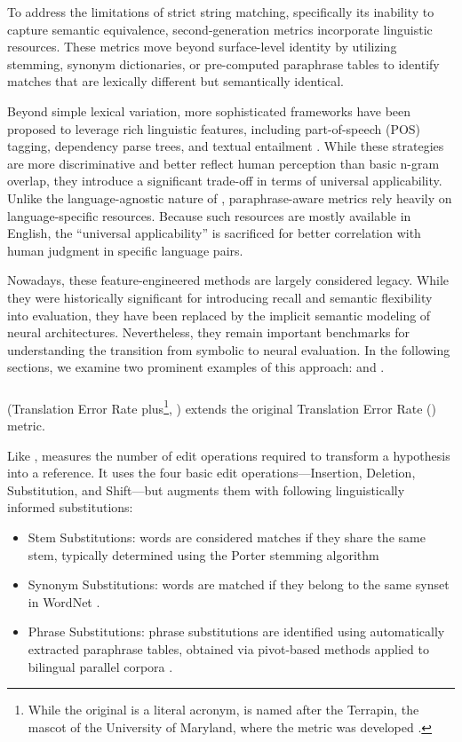 To address the limitations of strict string matching, specifically its inability to capture semantic equivalence, second-generation metrics incorporate linguistic resources. These metrics move beyond surface-level identity by utilizing stemming, synonym dictionaries, or pre-computed paraphrase tables to identify matches that are lexically different but semantically identical.

Beyond simple lexical variation, more sophisticated frameworks have been proposed to leverage rich linguistic features, including part-of-speech (POS) tagging, dependency parse trees, and textual entailment \citep{liu:2005, owczarzak:2007, Pado09, han-etal-2012-lepor}. While these strategies are more discriminative and better reflect human perception than basic n-gram overlap, they introduce a significant trade-off in terms of universal applicability. Unlike the language-agnostic nature of \bleu, paraphrase-aware metrics rely heavily on language-specific resources. Because such resources are mostly available in English, the ``universal applicability'' is sacrificed for better correlation with human judgment in specific language pairs.

Nowadays, these feature-engineered methods are largely considered legacy. While they were historically significant for introducing recall and semantic flexibility into evaluation, they have been replaced by the implicit semantic modeling of neural architectures. Nevertheless, they remain important benchmarks for understanding the transition from symbolic to neural evaluation. In the following sections, we examine two prominent examples of this approach: \terp and \mn.

\subsubsection{\terp}
\terp (Translation Error Rate plus\footnote{While the original \ter is a literal acronym, \terp is named after the Terrapin, the mascot of the University of Maryland, where the metric was developed \citep{terp}.}, \cite{terp}) extends the original Translation Error Rate (\ter) metric. 

Like \ter, \terp measures the number of edit operations required to transform a hypothesis into a reference. It uses the four basic edit operations—Insertion, Deletion, Substitution, and Shift—but augments them with following linguistically informed substitutions:

\begin{itemize}
    \item Stem Substitutions: words are considered matches if they share the same stem, typically determined using the Porter stemming algorithm \citep{porter1980algorithm}
    \item Synonym Substitutions: words are matched if they belong to the same synset in WordNet \citep{fellbaum98wordnet}.
    \item Phrase Substitutions: phrase substitutions are identified using automatically extracted paraphrase tables, obtained via pivot-based methods applied to bilingual parallel corpora \citep{pivoting}.
\end{itemize}


